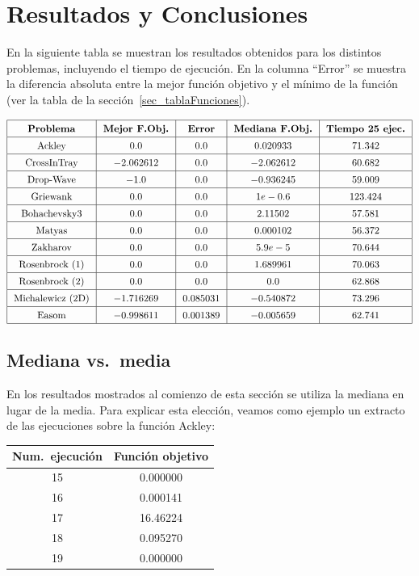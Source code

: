 \documentclass{article}
\begin{document}
\section{Resultados y Conclusiones}
En la siguiente tabla se muestran los resultados obtenidos para los distintos problemas, incluyendo el tiempo de ejecución. En la columna ``Error'' se muestra la diferencia absoluta entre la mejor función objetivo y el mínimo de la función (ver la tabla de la sección~\ref{sec_tablaFunciones}).

\[\arraycolsep=7pt\def\arraystretch{1.4}
\begin{array}{|c|c|c|c|c|}
\hline
\text{\textbf{Problema}} & \text{\textbf{Mejor F.Obj.}} & \text{\textbf{Error}} & \text{\textbf{Mediana F.Obj.}} & \text{\textbf{Tiempo 25 ejec.}} \\ \hline
\text{Ackley} & 0.0 & 0.0 & 0.020933 & 71.342 \\ \hline
\text{CrossInTray} & -2.062612 & 0.0 & -2.062612 & 60.682 \\ \hline
\text{Drop-Wave} & -1.0 & 0.0 & -0.936245 & 59.009 \\ \hline
\text{Griewank} & 0.0 & 0.0 & 1e-0.6 & 123.424 \\ \hline
\text{Bohachevsky3} & 0.0 & 0.0 & 2.11502 & 57.581 \\ \hline
\text{Matyas} & 0.0 & 0.0 & 0.000102 & 56.372 \\ \hline
\text{Zakharov} & 0.0 & 0.0 & 5.9e-5 & 70.644 \\ \hline
\text{Rosenbrock (1)} & 0.0 & 0.0 & 1.689961 & 70.063 \\ \hline
\text{Rosenbrock (2)} & 0.0 & 0.0 & 0.0 & 62.868 \\ \hline
\text{Michalewicz (2D)} & -1.716269 & 0.085031 & -0.540872 & 73.296 \\ \hline
\text{Easom} & -0.998611 & 0.001389 & -0.005659 & 62.741 \\ \hline
\end{array}\]

\subsection{Mediana vs.\ media}
En los resultados mostrados al comienzo de esta sección se utiliza la mediana en lugar de la media. Para explicar esta elección, veamos como ejemplo un extracto de las ejecuciones sobre la función Ackley:
\begin{table}[hb]
\centering
\begin{tabular}{cc}
    Num.\ ejecución & Función objetivo\\\toprule
    15&0.000000\\
    16&0.000141\\
    17&16.46224\\
    18&0.095270\\
    19&0.000000\\
\end{tabular}
\end{table}
\end{document}
